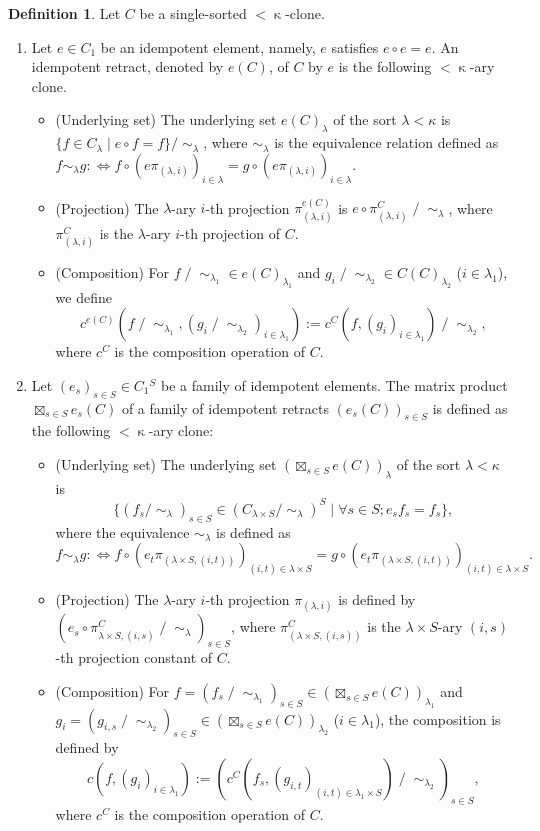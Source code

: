 \documentclass[a4paper,10pt]{article}
\theoremstyle{definition}
\newtheorem{df}{Definition}[section]
\newcommand\mc{\mathclose}
\begin{document}
\begin{df}
Let $C$ be a single-sorted $<\mc\kappa$-clone.
\begin{enumerate}
\item
Let $e\in C_1$ be an idempotent element, namely, $e$ satisfies $e\circ e=e$.
An idempotent retract, denoted by $e(C)$, of $C$ by $e$ is the following $<\mc\kappa$-ary clone.
\begin{itemize}
\item (Underlying set)
The underlying set $e(C)_{\lambda}$ of the sort $\lambda<\kappa$ is 
$\{f\in C_\lambda\mid e\circ f=f\}/\mc\sim_\lambda$,
where $\sim_\lambda$ is the equivalence relation defined as
$f\sim_\lambda g :\Leftrightarrow
f\circ (e\pi_{(\lambda,i)})_{i\in\lambda}=g\circ (e\pi_{(\lambda,i)})_{i\in\lambda}$.
\item (Projection)
The $\lambda$-ary $i$-th projection $\pi^{e(C)}_{(\lambda,i)}$
is $e\circ \pi^C_{(\lambda,i)}\mc/\mc\sim_\lambda$, where $\pi^C_{(\lambda,i)}$ is
the $\lambda$-ary $i$-th projection of $C$.
\item (Composition)
For $f\mc/\mc\sim_{\lambda_1}\in e(C)_{\lambda_1}$ and
$g_i\mc/\mc\sim_{\lambda_2}\in C(C)_{\lambda_2}$ ($i\in\lambda_1$), we define
\[
c^{e(C)}(f\mc/\mc\sim_{\lambda_1},(g_i\mc/\mc\sim_{\lambda_2})_{i\in\lambda_1})
:=c^C(f,(g_i)_{i\in\lambda_1})\mc/\mc\sim_{\lambda_2},
\]
where $c^C$ is the composition operation of $C$.
\end{itemize}
\item
Let $(e_s)_{s\in S}\in C_1{}^S$ be a family of idempotent elements.
The matrix product $\boxtimes_{s\in S}e_s(C)$ of a family of
idempotent retracts $(e_s(C))_{s\in S}$ is defined as
the following $<\mc\kappa$-ary clone:
\begin{itemize}
\item (Underlying set)
The underlying set $(\boxtimes_{s\in S}e(C))_{\lambda}$ of the sort $\lambda<\kappa$ is 
\[
\{(f_s/\mc\sim_{\lambda})_{s\in S}\in (C_{\lambda\times S}/\mc\sim_{\lambda})^S
 \mid \forall s\in S;e_sf_s=f_s\}, 
\]
where the equivalence $\sim_\lambda$ is defined as
\[
f\sim_{\lambda} g:\Longleftrightarrow
f\circ (e_t\pi_{(\lambda\times S,(i,t))})_{(i,t)\in\lambda\times S}
=g\circ (e_t\pi_{(\lambda\times S,(i,t))})_{(i,t)\in\lambda\times S}.
\]
\item (Projection)
The $\lambda$-ary $i$-th projection $\pi_{(\lambda,i)}$ is defined by
$(e_s\circ \pi^{C}_{\lambda\times S,(i,s)}\mc/\mc\sim_\lambda)_{s\in S}$,
where $\pi_{(\lambda\times S,(i,s))}^C$ is the $\lambda\times S$-ary $(i,s)$-th
projection constant of $C$.
\item (Composition)
For $f=(f_s\mc/\mc\sim_{\lambda_1})_{s\in S}\in (\boxtimes_{s\in S}e(C))_{\lambda_1}$
and $g_i=(g_{i,s}\mc/\mc\sim_{\lambda_2})_{s\in S}\in (\boxtimes_{s\in S}e(C))_{\lambda_2}$
($i\in\lambda_1$), the composition is defined by
\[
c(f,(g_i)_{i\in\lambda_1})
:=(c^C(f_s,(g_{i,t})_{(i,t)\in\lambda_1\times S})\mc/\mc\sim_{\lambda_2})_{s\in S},
\]
where $c^C$ is the composition operation of $C$.
\end{itemize}
\end{enumerate}
\end{df}
\end{document}
